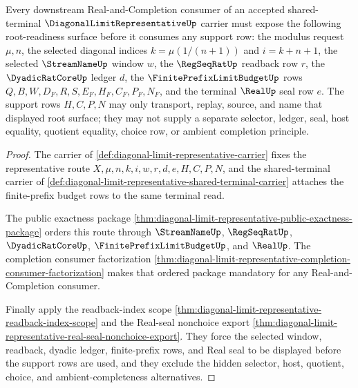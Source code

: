 \begin{theorem}
\label{thm:diagonal-limit-representative-root-readiness-triad}
Every downstream Real-and-Completion consumer of an accepted shared-terminal $\DiagonalLimitRepresentativeUp$ carrier must expose the following root-readiness surface before it consumes any support row: the modulus request $\mu,n$, the selected diagonal indices $k=\mu(1/(n+1))$ and $i=k+n+1$, the selected $\StreamNameUp$ window $w$, the $\RegSeqRatUp$ readback row $r$, the $\DyadicRatCoreUp$ ledger $d$, the $\FinitePrefixLimitBudgetUp$ rows $Q,B,W,D_F,R,S,E_F,H_F,C_F,P_F,N_F$, and the terminal $\RealUp$ seal row $e$. The support rows $H,C,P,N$ may only transport, replay, source, and name that displayed root surface; they may not supply a separate selector, ledger, seal, host equality, quotient equality, choice row, or ambient completion principle.
\end{theorem}
\begin{proof}
The carrier of \autoref{def:diagonal-limit-representative-carrier} fixes the representative route $X,\mu,n,k,i,w,r,d,e,H,C,P,N$, and the shared-terminal carrier of \autoref{def:diagonal-limit-representative-shared-terminal-carrier} attaches the finite-prefix budget rows to the same terminal read.

The public exactness package \autoref{thm:diagonal-limit-representative-public-exactness-package} orders this route through $\StreamNameUp$, $\RegSeqRatUp$, $\DyadicRatCoreUp$, $\FinitePrefixLimitBudgetUp$, and $\RealUp$. The completion consumer factorization \autoref{thm:diagonal-limit-representative-completion-consumer-factorization} makes that ordered package mandatory for any Real-and-Completion consumer.

Finally apply the readback-index scope \autoref{thm:diagonal-limit-representative-readback-index-scope} and the Real-seal nonchoice export \autoref{thm:diagonal-limit-representative-real-seal-nonchoice-export}. They force the selected window, readback, dyadic ledger, finite-prefix rows, and Real seal to be displayed before the support rows are used, and they exclude the hidden selector, host, quotient, choice, and ambient-completeness alternatives.
\end{proof}

